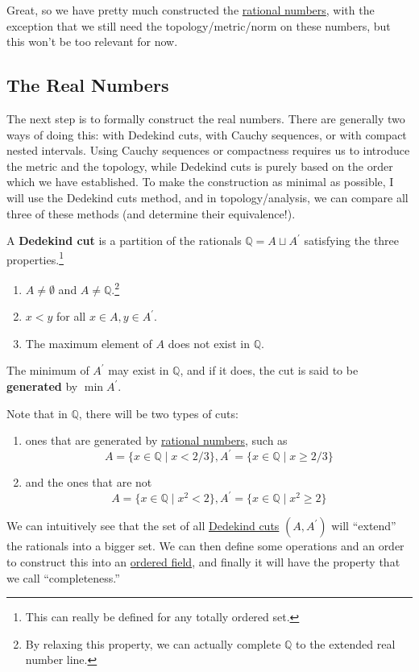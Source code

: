   Great, so we have pretty much constructed the \hyperref[def:rational-numbers]{rational numbers}, with the exception that we still need the topology/metric/norm on these numbers, but this won't be too relevant for now. 

\subsection{The Real Numbers}

  The next step is to formally construct the real numbers. There are generally two ways of doing this: with Dedekind cuts, with Cauchy sequences, or with compact nested intervals. Using Cauchy sequences or compactness requires us to introduce the metric and the topology, while Dedekind cuts is purely based on the order which we have established. To make the construction as minimal as possible, I will use the Dedekind cuts method, and in topology/analysis, we can compare all three of these methods (and determine their equivalence!). 

  \begin{definition}
    \label{def:dedekind-cut}
 
    A \textbf{Dedekind cut} is a partition of the rationals $\mathbb{Q} = A \sqcup A^\prime$ satisfying the three properties.\footnote{This can really be defined for any totally ordered set. } 
    \begin{enumerate}
      \item $A \neq \emptyset$ and $A \neq \mathbb{Q}$.\footnote{By relaxing this property, we can actually complete $\mathbb{Q}$ to the extended real number line. }
      \item $x < y$ for all $x \in A, y \in A^\prime$. 
      \item The maximum element of $A$ does not exist in $\mathbb{Q}$. 
    \end{enumerate}
    The minimum of $A^\prime$ may exist in $\mathbb{Q}$, and if it does, the cut is said to be \textbf{generated} by $\min A^\prime$. 
  \end{definition}

  Note that in $\mathbb{Q}$, there will be two types of cuts: 
  \begin{enumerate}
    \item ones that are generated by \hyperref[def:rational-numbers]{rational numbers}, such as 
    \begin{equation}
      A = \{x \in \mathbb{Q} \mid x < 2/3 \}, A^\prime = \{ x \in \mathbb{Q} \mid x \geq 2/3 \} 
    \end{equation}
    \item and the ones that are not 
    \begin{equation}
      A = \{x \in \mathbb{Q} \mid x^2 < 2 \}, A^\prime = \{x \in \mathbb{Q} \mid x^2 \geq 2 \}
    \end{equation}
  \end{enumerate}
  We can intuitively see that the set of all \hyperref[def:dedekind-cut]{Dedekind cuts} $(A, A^\prime)$ will ``extend'' the rationals into a bigger set. We can then define some operations and an order to construct this into an \hyperref[def:ordered-field]{ordered field}, and finally it will have the property that we call ``completeness.''

